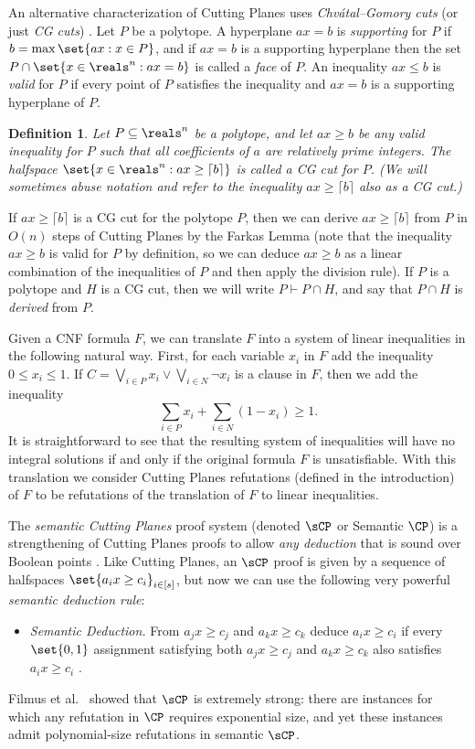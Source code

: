 \documentclass[11pt]{article}
\newtheorem{definition}[theorem]{Definition}
\begin{document}
An alternative characterization of Cutting Planes uses
\emph{Chv\'{a}tal--Gomory cuts} (or just \emph{CG cuts}) \cite{CookCT87, Chvatal73a}.
Let $P$ be a polytope.
A hyperplane $ax = b$ is \emph{supporting} for $P$ if $b = \max \set{ax : x \in P}$, and if $ax = b$ is a supporting hyperplane then the set $P \cap \set{x \in \reals^n : ax = b}$ is called a \emph{face} of $P$.
An inequality $ax \leq b$ is \emph{valid} for $P$ if every point of $P$ satisfies the inequality and $ax = b$ is a supporting hyperplane of $P$.
\begin{definition}\label{def:cg-cut}
	Let $P \subseteq \reals^n$ be a polytope, and let $ax \geq b$ be any valid inequality for $P$ such that all coefficients of $a$ are relatively prime integers.
	The halfspace $\set{x \in \reals^n : ax \geq \lceil b \rceil}$ is called a \emph{CG cut} for $P$. (We will sometimes abuse notation and refer to the inequality $ax \geq \lceil b \rceil$ also as a CG cut.)
\end{definition}
If $ax \geq \lceil b \rceil$ is a CG cut for the polytope $P$, then we can derive $ax \geq \lceil b \rceil$ from $P$ in $O(n)$ steps of Cutting Planes by
the  %
Farkas Lemma (note that the inequality $ax \geq b$ is valid for $P$ by definition, so we can deduce $ax \geq b$ as a linear combination of the inequalities of $P$ and then apply the division rule).
If $P$ is a polytope and $H$ is a CG cut, then we will write $P \vdash P \cap H$, and say that $P \cap H$ is \emph{derived} from $P$.


Given a CNF formula $F$, we can translate $F$ into a system of linear inequalities in the following natural way.
First, for each variable $x_i$ in $F$ add the inequality $0 \leq x_i \leq 1$.
If $C = \bigvee_{i \in P} x_i \vee \bigvee_{i \in N} \neg x_i$ is a clause in $F$, then we add the inequality \[\sum_{i \in P} x_i + \sum_{i \in N} (1-x_i) \geq 1. \]
It is straightforward to see that the resulting system of inequalities will have no integral solutions if and only if the original formula $F$ is unsatisfiable.
With this translation we consider Cutting Planes refutations (defined in the introduction) of $F$ to be refutations of the translation of $F$ to linear inequalities.



The \emph{semantic Cutting Planes} proof system (denoted $\sCP$ or Semantic $\CP$) is a strengthening of Cutting Planes proofs to allow \emph{any deduction} that is sound over Boolean points \cite{BonetPR97}.
Like Cutting Planes, an $\sCP$ proof is given by a sequence of halfspaces $\set{a_ix \geq c_i}_{i \in [s]}$, but now we can use the following very powerful \emph{semantic deduction rule}:
\begin{itemize}
	\item \emph{Semantic Deduction.} From $a_j x \geq c_j$ and $a_k x \geq c_k$ deduce $a_i x \geq c_i$ if every $\set{0,1}$ assignment satisfying both $a_jx \geq c_j$ and $a_k x \geq c_k$  also satisfies $a_ix \geq c_i$ .
\end{itemize}
Filmus et al.~\cite{FilmusHL16} showed that $\sCP$ is extremely strong: there are instances for which any refutation in $\CP$ requires exponential size, and yet these instances admit  polynomial-size refutations in semantic $\sCP$. 
\end{document}
